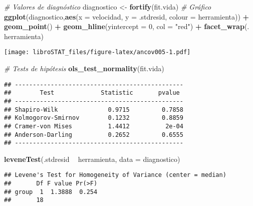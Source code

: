 \documentclass[
]{book}
\newenvironment{Shaded}{\begin{snugshade}}{\end{snugshade}}
\newcommand{\CommentTok}[1]{\textcolor[rgb]{0.56,0.35,0.01}{\textit{#1}}}
\newcommand{\DataTypeTok}[1]{\textcolor[rgb]{0.13,0.29,0.53}{#1}}
\newcommand{\DecValTok}[1]{\textcolor[rgb]{0.00,0.00,0.81}{#1}}
\newcommand{\KeywordTok}[1]{\textcolor[rgb]{0.13,0.29,0.53}{\textbf{#1}}}
\newcommand{\NormalTok}[1]{#1}
\newcommand{\OperatorTok}[1]{\textcolor[rgb]{0.81,0.36,0.00}{\textbf{#1}}}
\newcommand{\StringTok}[1]{\textcolor[rgb]{0.31,0.60,0.02}{#1}}
\theoremstyle{definition}
\theoremstyle{definition}
\theoremstyle{definition}
\theoremstyle{remark}
\begin{document}
\begin{Shaded}
\begin{Highlighting}[]
\CommentTok{# Valores de diagnóstico}
\NormalTok{diagnostico <-}\StringTok{ }\KeywordTok{fortify}\NormalTok{(fit.vida)}
\CommentTok{# Gráfico}
\KeywordTok{ggplot}\NormalTok{(diagnostico,}\KeywordTok{aes}\NormalTok{(}\DataTypeTok{x =}\NormalTok{ velocidad, }\DataTypeTok{y =}\NormalTok{ .stdresid, }\DataTypeTok{colour =}\NormalTok{ herramienta)) }\OperatorTok{+}\StringTok{ }
\StringTok{   }\KeywordTok{geom_point}\NormalTok{() }\OperatorTok{+}
\StringTok{   }\KeywordTok{geom_hline}\NormalTok{(}\DataTypeTok{yintercept =} \DecValTok{0}\NormalTok{, }\DataTypeTok{col =} \StringTok{"red"}\NormalTok{) }\OperatorTok{+}
\StringTok{   }\KeywordTok{facet_wrap}\NormalTok{(. }\OperatorTok{~}\StringTok{ }\NormalTok{herramienta)}
\end{Highlighting}
\end{Shaded}

\texttt{[image: libroSTAT\_files/figure-latex/ancov005-1.pdf]}

\begin{Shaded}
\begin{Highlighting}[]
\CommentTok{# Tests de hipótesis}
\KeywordTok{ols_test_normality}\NormalTok{(fit.vida)}
\end{Highlighting}
\end{Shaded}

\begin{verbatim}
## -----------------------------------------------
##        Test             Statistic       pvalue  
## -----------------------------------------------
## Shapiro-Wilk              0.9715         0.7858 
## Kolmogorov-Smirnov        0.1232         0.8859 
## Cramer-von Mises          1.4412          2e-04 
## Anderson-Darling          0.2652         0.6555 
## -----------------------------------------------
\end{verbatim}

\begin{Shaded}
\begin{Highlighting}[]
\KeywordTok{leveneTest}\NormalTok{(.stdresid }\OperatorTok{~}\StringTok{ }\NormalTok{herramienta, }\DataTypeTok{data =}\NormalTok{ diagnostico)}
\end{Highlighting}
\end{Shaded}

\begin{verbatim}
## Levene's Test for Homogeneity of Variance (center = median)
##       Df F value Pr(>F)
## group  1  1.3888  0.254
##       18
\end{verbatim}
\end{document}
